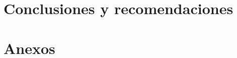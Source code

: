 \documentclass[letterpaper, oneside, openright, 12pt]{book}
\begin{document}
  \chapter{Conclusiones y recomendaciones}
  
  \newpage %

  \cleardoublepage
  \printbibliography

  \setcounter{section}{0} %
  \renewcommand{\thesection}{\arabic{section}}
  \chapter*{Anexos}
  
\end{document}
